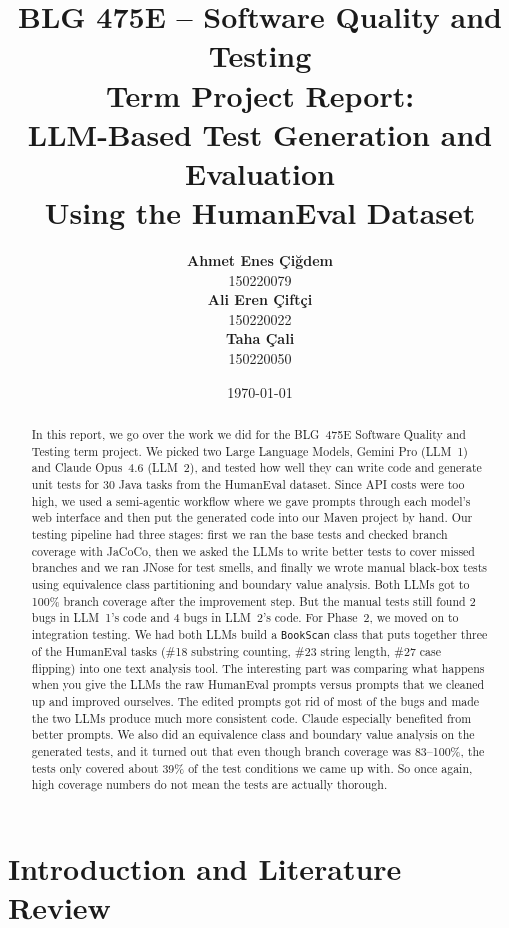 \documentclass[12pt, a4paper]{article}
\title{
    \vspace{-1cm}
    \textbf{BLG 475E -- Software Quality and Testing} \\[0.5cm]
    \Large\textbf{Term Project Report:} \\
    \Large{LLM-Based Test Generation and Evaluation \\
    Using the HumanEval Dataset}
    \vspace{0.5cm}
}
\author{
    \textbf{Ahmet Enes \c{C}i\u{g}dem} \\ 150220079 \\[0.3cm]
    \textbf{Ali Eren \c{C}ift\c{c}i} \\ 150220022 \\[0.3cm]
    \textbf{Taha \c{C}ali} \\ 150220050
}
\date{\today}
\begin{document}
\maketitle
\thispagestyle{empty}

\begin{abstract}
In this report, we go over the work we did for the BLG~475E Software Quality and Testing term project. We picked two Large Language Models, Gemini Pro (LLM~1) and Claude Opus~4.6 (LLM~2), and tested how well they can write code and generate unit tests for 30 Java tasks from the HumanEval dataset. Since API costs were too high, we used a semi-agentic workflow where we gave prompts through each model's web interface and then put the generated code into our Maven project by hand. Our testing pipeline had three stages: first we ran the base tests and checked branch coverage with JaCoCo, then we asked the LLMs to write better tests to cover missed branches and we ran JNose for test smells, and finally we wrote manual black-box tests using equivalence class partitioning and boundary value analysis. Both LLMs got to 100\% branch coverage after the improvement step. But the manual tests still found 2 bugs in LLM~1's code and 4 bugs in LLM~2's code. For Phase~2, we moved on to integration testing. We had both LLMs build a \texttt{BookScan} class that puts together three of the HumanEval tasks (\#18 substring counting, \#23 string length, \#27 case flipping) into one text analysis tool. The interesting part was comparing what happens when you give the LLMs the raw HumanEval prompts versus prompts that we cleaned up and improved ourselves. The edited prompts got rid of most of the bugs and made the two LLMs produce much more consistent code. Claude especially benefited from better prompts. We also did an equivalence class and boundary value analysis on the generated tests, and it turned out that even though branch coverage was 83--100\%, the tests only covered about 39\% of the test conditions we came up with. So once again, high coverage numbers do not mean the tests are actually thorough.
\end{abstract}

\newpage
\tableofcontents
\newpage

\section{Introduction and Literature Review}
\label{sec:introduction}
\end{document}
